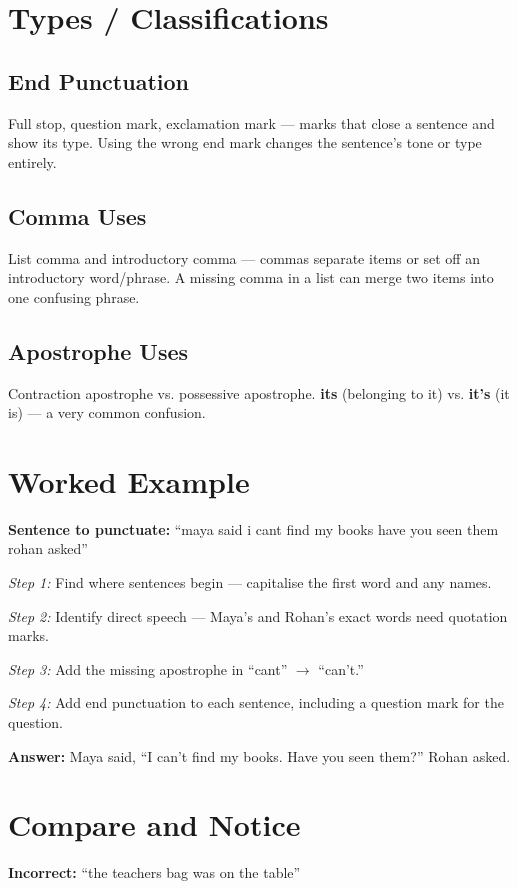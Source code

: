 \section{Types / Classifications}

\subsection*{End Punctuation}
Full stop, question mark, exclamation mark --- marks that close a sentence and show its type. Using the wrong end mark changes the sentence's tone or type entirely.

\subsection*{Comma Uses}
List comma and introductory comma --- commas separate items or set off an introductory word/phrase. A missing comma in a list can merge two items into one confusing phrase.

\subsection*{Apostrophe Uses}
Contraction apostrophe vs. possessive apostrophe. \textbf{its} (belonging to it) vs. \textbf{it's} (it is) --- a very common confusion.

\section{Worked Example}
\begin{examplebox}
\textbf{Sentence to punctuate:} ``maya said i cant find my books have you seen them rohan asked''

\textit{Step 1:} Find where sentences begin --- capitalise the first word and any names.

\textit{Step 2:} Identify direct speech --- Maya's and Rohan's exact words need quotation marks.

\textit{Step 3:} Add the missing apostrophe in ``cant'' $\rightarrow$ ``can't.''

\textit{Step 4:} Add end punctuation to each sentence, including a question mark for the question.

\textbf{Answer:} Maya said, ``I can't find my books. Have you seen them?'' Rohan asked.
\end{examplebox}

\section{Compare and Notice}
\textbf{Incorrect:} ``the teachers bag was on the table''

